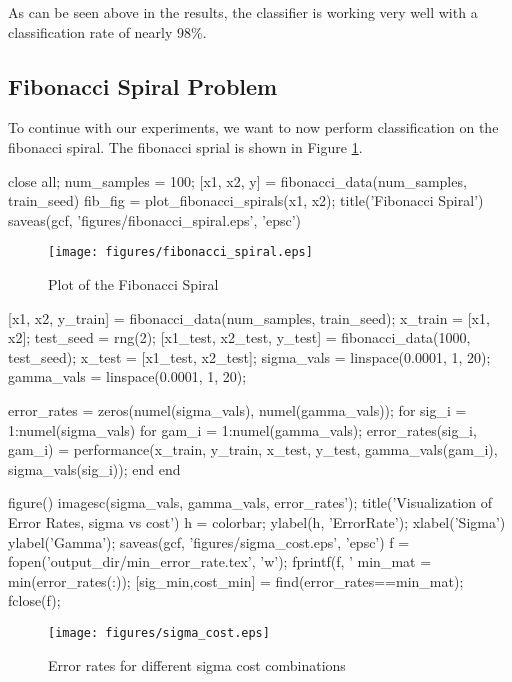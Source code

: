 \documentclass[11pt, twoside]{article}   	%
\newenvironment{matlab}{\comment}{\endcomment}
\begin{document}
As can be seen above in the results, the classifier is working very well with a classification rate of nearly 98\%. 


\subsection{Fibonacci Spiral Problem}
To continue with our experiments, we want to now perform classification on
the fibonacci spiral. The fibonacci sprial is shown in Figure \ref{fig:fibonacci_spiral}. 

\begin{matlab}
close all;
num_samples = 100; 
[x1, x2, y] = fibonacci_data(num_samples, train_seed)
fib_fig = plot_fibonacci_spirals(x1, x2); 
title('Fibonacci Spiral')
saveas(gcf, 'figures/fibonacci_spiral.eps', 'epsc')
\end{matlab}

\begin{figure}[h]
\centering
\texttt{[image: figures/fibonacci\_spiral.eps]}
\caption{Plot of the Fibonacci Spiral}
\label{fig:fibonacci_spiral} 
\end{figure}


\begin{matlab}

[x1, x2, y_train] = fibonacci_data(num_samples, train_seed);
x_train = [x1, x2];
test_seed = rng(2); 
[x1_test, x2_test, y_test] = fibonacci_data(1000, test_seed);
x_test = [x1_test, x2_test];
sigma_vals = linspace(0.0001, 1, 20); 
gamma_vals = linspace(0.0001, 1, 20);

error_rates = zeros(numel(sigma_vals), numel(gamma_vals)); 
for sig_i = 1:numel(sigma_vals)
   for gam_i = 1:numel(gamma_vals); 
      error_rates(sig_i, gam_i) = performance(x_train, y_train, x_test, y_test, gamma_vals(gam_i), sigma_vals(sig_i)); 
   end
end

figure()
imagesc(sigma_vals, gamma_vals, error_rates');
title('Visualization of Error Rates, sigma vs cost')
h = colorbar;
ylabel(h, 'ErrorRate');
xlabel('Sigma')
ylabel('Gamma'); 
saveas(gcf, 'figures/sigma_cost.eps', 'epsc')
f = fopen('output_dir/min_error_rate.tex', 'w'); 
fprintf(f, '%
min_mat = min(error_rates(:));
[sig_min,cost_min] = find(error_rates==min_mat);
fclose(f);
\end{matlab}

\begin{figure}[h]
\centering
\texttt{[image: figures/sigma\_cost.eps]}
\caption{Error rates for different sigma cost combinations}
\label{fig:sigma_cost} 
\end{figure}
\end{document}
